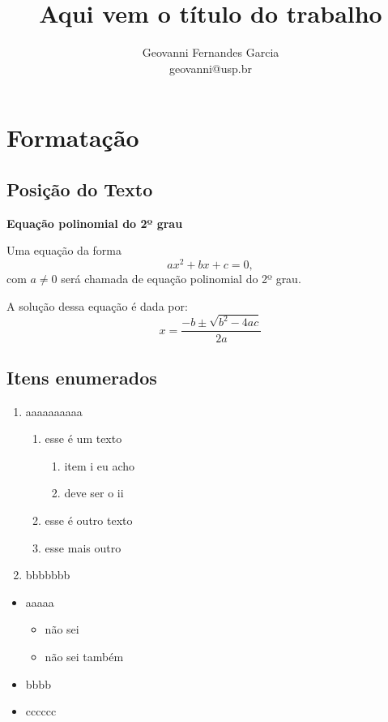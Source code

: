 \documentclass[a4paper,12pt]{article}
\title{Aqui vem o título do trabalho}
\author{Geovanni Fernandes Garcia \\ geovanni@usp.br}
\begin{document}
\maketitle
\tableofcontents
\listoffigures
\listoftables \newpage

\section{Formatação}

\subsection{Posição do Texto}

\begin{center}
\textbf{Equação polinomial do 2º grau}
\end{center}

Uma equação da forma $$ax^2 + bx + c = 0,$$ com $a \neq 0$ será chamada de
equação polinomial do 2º grau.

A solução dessa equação é dada por:
$$x = \frac{-b \pm \sqrt{b^2 - 4ac}}{2a}$$

\subsection{Itens enumerados}

\begin{enumerate}
 \item aaaaaaaaaa
  \begin{enumerate}
   \item esse é um texto
    \begin{enumerate}
     \item item i eu acho
     \item deve ser o ii
    \end{enumerate}
   \item esse é outro texto
   \item esse mais outro
  \end{enumerate}
 \item bbbbbbb
\end{enumerate}

\begin{itemize}
 \item aaaaa
  \begin{itemize}
   \item não sei
   \item não sei também
  \end{itemize}
 \item bbbb
 \item cccccc
\end{itemize}
\end{document}
